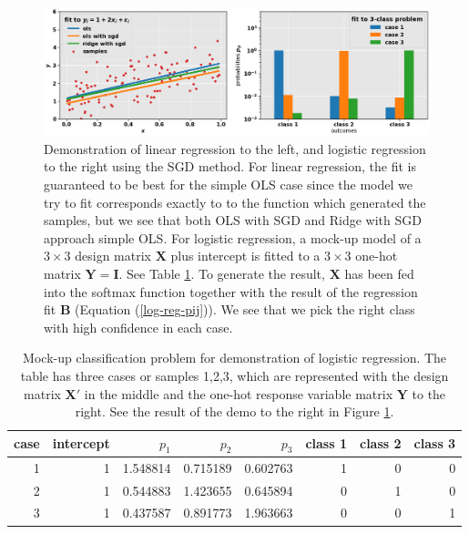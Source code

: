 \documentclass[]{article}
\begin{document}
\begin{figure}[!htb]
	\centering
	\includegraphics[width=1\linewidth]{demo_lin_log_reg.png}
	\caption{Demonstration of linear regression to the left, and logistic regression to the right using the SGD method. For linear regression, the fit is guaranteed to be best for the simple OLS case since the model we try to fit corresponds exactly to to the function which generated the samples, but we see that both OLS with SGD and Ridge with SGD approach simple OLS. For logistic regression, a mock-up model of a $3 \times 3$ design matrix $\mathbf{X}$ plus intercept is fitted to a $3 \times 3$ one-hot matrix $\mathbf{Y} = \mathbf{I}$. See Table \ref{tab:logreg-demo}. To generate the result, $\mathbf{X}$ has been fed into the softmax function together with the result of the regression fit $\mathbf{B}$ (Equation (\ref{log-reg-pij})). We see that we pick the right class with high confidence in each case.}
	\label{fig:demo_lin_log_reg}
\end{figure}



\begin{table}[!ht]
	\caption{Mock-up classification problem for demonstration of logistic regression. The table has three cases or samples 1,2,3, which are represented with the design matrix $\mathbf{X}'$ in the middle and the one-hot response variable matrix $\mathbf{Y}$ to the right. See the result of the demo to the right in Figure \ref{fig:demo_lin_log_reg}.}
	\label{tab:logreg-demo}
	\begin{center}
		\begin{tabular}{r|rrrr|rrr}
			\toprule
			case &  intercept &     $p_1$ &     $p_2$ &     $p_3$ &  class 1 &  class 2 &  class 3 \\
			\midrule
			1 &          1 &  1.548814 &  0.715189 &  0.602763 &        1 &        0 &        0 \\
			2 &          1 &  0.544883 &  1.423655 &  0.645894 &        0 &        1 &        0 \\
			3 &          1 &  0.437587 &  0.891773 &  1.963663 &        0 &        0 &        1 \\
			\bottomrule
		\end{tabular}
	\end{center}
\end{table}
\end{document}
